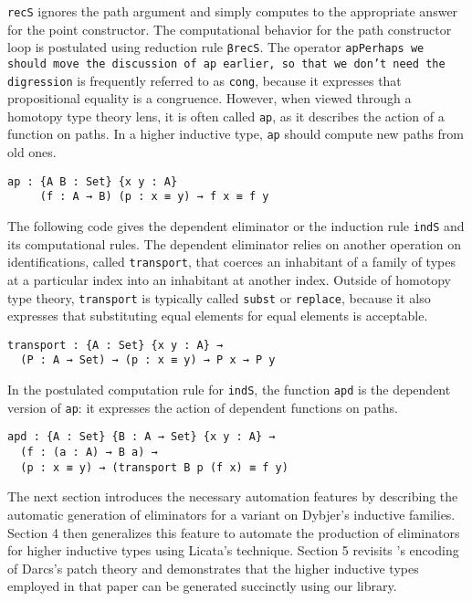 \documentclass[sigplan,10pt]{acmart}
\begin{document}
{\tt recS} ignores the path argument and simply computes to the appropriate answer for the point constructor. The computational behavior for the path constructor loop is postulated using reduction rule {\tt βrecS}.
The operator \texttt{ap}\texttt{Perhaps we should move the discussion of ap earlier, so that we don't need the digression} is frequently referred to as \texttt{cong}, because it expresses that propositional equality is a congruence.
However, when viewed through a homotopy type theory lens, it is often called \texttt{ap}, as it describes the action of a function on paths.
In a higher inductive type, \texttt{ap} should compute new paths from old ones.
\begin{center}
\begin{BVerbatim}
ap : {A B : Set} {x y : A}
     (f : A → B) (p : x ≡ y) → f x ≡ f y
\end{BVerbatim}
\end{center}

The following code gives the dependent eliminator or the induction rule {\tt indS} and its computational rules.
The dependent eliminator relies on another operation on identifications, called \texttt{transport}, that coerces an inhabitant of a family of types at a particular index into an inhabitant at another index.
Outside of homotopy type theory, \texttt{transport} is typically called \texttt{subst} or \texttt{replace}, because it also expresses that substituting equal elements for equal elements is acceptable.
\begin{center}
\begin{Verbatim}
transport : {A : Set} {x y : A} → 
  (P : A → Set) → (p : x ≡ y) → P x → P y
\end{Verbatim}
\end{center}

In the postulated computation rule for \texttt{indS}, the function {\tt apd} is the dependent version of \texttt{ap}: it expresses the action of dependent functions on paths.
\begin{center}
\begin{Verbatim}
apd : {A : Set} {B : A → Set} {x y : A} → 
  (f : (a : A) → B a) → 
  (p : x ≡ y) → (transport B p (f x) ≡ f y)
\end{Verbatim}
\end{center}

The next section introduces the necessary automation features by describing the automatic generation of eliminators for a variant on Dybjer's inductive families. Section 4 then generalizes this feature to automate the production of eliminators for higher inductive types using Licata's technique. Section 5 revisits \citeauthor{Angiuli-2014}'s encoding of Darcs's patch theory \citep{Angiuli-2014} and demonstrates that the higher inductive types employed in that paper can be generated succinctly using our library.
\end{document}
